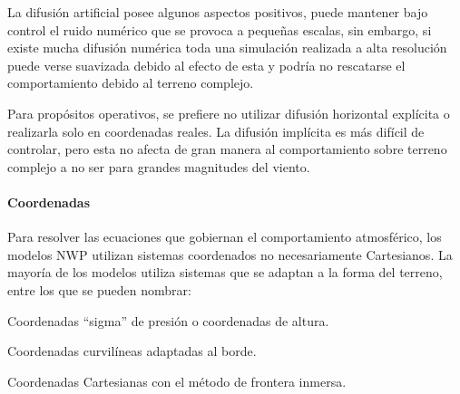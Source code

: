 La difusión artificial posee algunos aspectos positivos, puede mantener bajo control el ruido numérico que se provoca a pequeñas escalas, sin embargo, si existe mucha difusión numérica toda una simulación realizada a alta resolución puede verse suavizada debido al efecto de esta y podría no rescatarse el comportamiento debido al terreno complejo.

Para propósitos operativos, se prefiere no utilizar difusión horizontal explícita o realizarla solo en coordenadas reales. La difusión implícita es más difícil de controlar, pero esta no afecta de gran manera al comportamiento sobre terreno complejo a no ser para grandes magnitudes del viento. 
\paragraph{Coordenadas} Para resolver las ecuaciones que gobiernan el comportamiento atmosférico, los modelos NWP utilizan sistemas coordenados no necesariamente Cartesianos. La mayoría de los modelos utiliza sistemas que se adaptan a la forma del terreno, entre los que se pueden nombrar:
\begin{itemize*}
	\item Coordenadas ``sigma'' de presión o coordenadas de altura.
	\item Coordenadas curvilíneas adaptadas al borde.
	\item Coordenadas Cartesianas con el método de frontera inmersa.
\end{itemize*}

